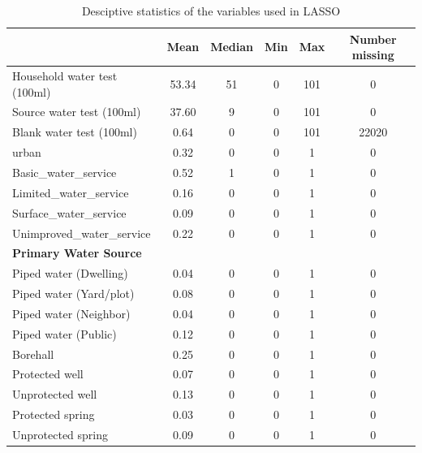 \begin{table}[htbp]\centering
\def\sym#1{\ifmmode^{#1}\else\(^{#1}\)\fi}
\caption{Desciptive statistics of the variables used in LASSO \label{Desc0}}
\begin{tabular}{l*{5}{c}}
\hline\hline
                    &\multicolumn{1}{c}{Mean}&\multicolumn{1}{c}{Median}&\multicolumn{1}{c}{Min}&\multicolumn{1}{c}{Max}&\multicolumn{1}{c}{Number missing}\\
                    
\hline
Household water test (100ml)&       53.34&       51&        0&      101&        0\\
Source water test (100ml)&       37.60&        9&        0&      101&        0\\
Blank water test (100ml)&        0.64&        0&        0&      101&    22020\\
urban               &        0.32&        0&        0&        1&        0\\
Basic_water_service &        0.52&        1&        0&        1&        0\\
Limited_water_service&        0.16&        0&        0&        1&        0\\
Surface_water_service&        0.09&        0&        0&        1&        0\\
Unimproved_water_service&        0.22&        0&        0&        1&        0\\
\textbf{Primary Water Source} \\\hline Piped water (Dwelling)&        0.04&        0&        0&        1&        0\\
Piped water (Yard/plot)&        0.08&        0&        0&        1&        0\\
Piped water (Neighbor)&        0.04&        0&        0&        1&        0\\
Piped water (Public)&        0.12&        0&        0&        1&        0\\
Borehall            &        0.25&        0&        0&        1&        0\\
Protected well      &        0.07&        0&        0&        1&        0\\
Unprotected well    &        0.13&        0&        0&        1&        0\\
Protected spring    &        0.03&        0&        0&        1&        0\\
Unprotected spring  &        0.09&        0&        0&        1&        0\\

\end{tabular}
\end{table}
